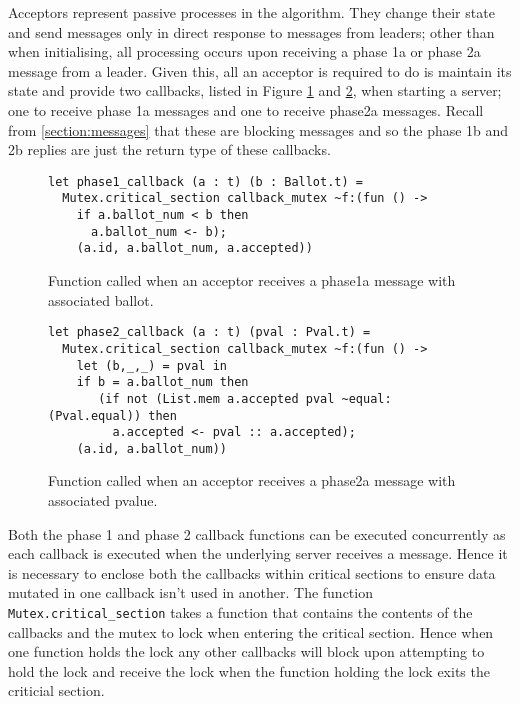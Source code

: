 Acceptors represent passive processes in the algorithm. They change their state and send messages only in direct response to messages from leaders; other than when initialising, all processing occurs upon receiving a phase 1a or phase 2a message from a leader. Given this, all an acceptor is required to do is maintain its state and provide two callbacks, listed in Figure \ref{fig:acceptor-phase1} and \ref{fig:acceptor-phase2}, when starting a server; one to receive phase 1a messages and one to receive phase2a messages. Recall from \ref{section:messages} that these are blocking messages and so the phase 1b and 2b replies are just the return type of these callbacks. \\

\begin{figure}
  \begin{lstlisting}
let phase1_callback (a : t) (b : Ballot.t) =
  Mutex.critical_section callback_mutex ~f:(fun () ->
    if a.ballot_num < b then
      a.ballot_num <- b);
    (a.id, a.ballot_num, a.accepted))
\end{lstlisting}
  \centering
  \caption{Function called when an acceptor receives a phase1a message with associated ballot.}
  \label{fig:acceptor-phase1}
\end{figure}

\begin{figure}
  \begin{lstlisting}
let phase2_callback (a : t) (pval : Pval.t) =
  Mutex.critical_section callback_mutex ~f:(fun () ->
    let (b,_,_) = pval in
    if b = a.ballot_num then
       (if not (List.mem a.accepted pval ~equal:(Pval.equal)) then
         a.accepted <- pval :: a.accepted);
    (a.id, a.ballot_num))
  \end{lstlisting}
  \centering
  \caption{Function called when an acceptor receives a phase2a message with associated pvalue.}
  \label{fig:acceptor-phase2}
\end{figure}

Both the phase 1 and phase 2 callback functions can be executed concurrently as each callback is executed when the underlying server receives a message. Hence it is necessary to enclose both the callbacks within critical sections to ensure data mutated in one callback isn't used in another. The function \texttt{Mutex.critical\_section} takes a function that contains the contents of the callbacks and the mutex to lock when entering the critical section. Hence when one function holds the lock any other callbacks will block upon attempting to hold the lock and receive the lock when the function holding the lock exits the criticial section. \\

